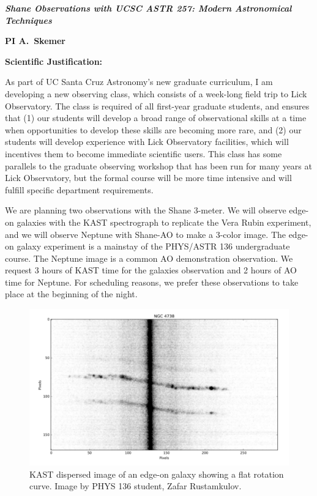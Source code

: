 \documentclass[12pt]{article}
\begin{document}
\noindent
\centerline{\bf \textit{Shane Observations with UCSC ASTR 257: Modern Astronomical Techniques}} 
\centerline{\bf PI A.\ Skemer}

\vskip 15pt

\centerline{\bf  Scientific Justification: }

As part of UC Santa Cruz Astronomy's new graduate curriculum, I am developing a new observing class, which consists of a week-long field trip to Lick Observatory.  The class is required of all first-year graduate students, and ensures that (1) our students will develop a broad range of observational skills at a time when opportunities to develop these skills are becoming more rare, and (2) our students will develop experience with Lick Observatory facilities, which will incentives them to become immediate scientific users.  This class has some parallels to the graduate observing workshop that has been run for many years at Lick Observatory, but the formal course will be more time intensive and will fulfill specific department requirements.

We are planning two observations with the Shane 3-meter.  We will observe edge-on galaxies with the KAST spectrograph to replicate the Vera Rubin experiment, and we will observe Neptune with Shane-AO to make a 3-color image.  The edge-on galaxy experiment is a mainstay of the PHYS/ASTR 136 undergraduate course.  The Neptune image is a common AO demonstration observation.  We request 3 hours of KAST time for the galaxies observation and 2 hours of AO time for Neptune.  For scheduling reasons, we prefer these observations to take place at the beginning of the night.

\newpage


\begin{figure}[t!]
  \centering
\includegraphics[width=15cm]{fig1.pdf}
  \caption{KAST dispersed image of an edge-on galaxy showing a flat rotation curve.  Image by PHYS 136 student, Zafar Rustamkulov.}
\end{figure}
\end{document}
